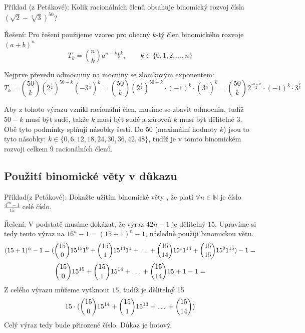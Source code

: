 \documentclass[12pt]{article}
\begin{document}
Příklad (z Petákové): Kolik racionálních členů obsahuje binomický rozvoj čísla $(\sqrt{2} - \sqrt[3]{3})^{50}$?

Řešení: Pro řešení použijeme vzorec pro obecný $k$-tý člen binomického rozvoje $(a + b)^n$
\[T_k = \binom{n}{k}a^{n-k}b^k, \qquad k\in\{0,1,2,\dots,n\}\]

Nejprve převedu odmocniny na mocniny se zlomkovým exponentem:
\[T_k = \binom{50}{k}(2^\frac{1}{2})^{50-k}(-3^\frac{1}{3})^k = 
\binom{50}{k}(2^\frac{1}{2})^{50-k}\cdot(-1)^k\cdot(3^\frac{1}{3})^k = 
\binom{50}{k}2^{\frac{50-k}{2}}\cdot(-1)^k\cdot 3^{\frac{k}{3}}\]

Aby z tohoto výrazu vznikl racionální člen, musíme se zbavit odmocnin, 
tudíž $50-k$ musí být sudé, takže $k$ musí být sudé a zároveň $k$ musí být 
dělitelné $3$. Obě tyto podmínky splňují násobky šesti. Do $50$ (maximální 
hodnoty $k$) jsou to tyto násobky: $k \in \{0,6,12,18,24,30,36,42,48\}$, tudíž 
je v tomto binomickém rozvoji celkem 9 racionálních členů.

\subsection*{Použití binomické věty v důkazu}
Příklad(z Petákové): Dokažte užitím binomické věty , že platí $\forall n \in \mathbb{N}$ je číslo $\frac{4^{2n}-1}{15}$ celé číslo.

Řešení: V podstatě musíme dokázat, že výraz $4{2n} -1$ je dělitelný $15$. Upravíme si tedy tento výraz na $16^n -1 = (15 + 1)^n - 1$, následně použiji binomickou větu.
\[(15 + 1)^n -1 = (\binom{15}{0}15^{15}1^0 + \binom{15}{1}15^{14}1^1 + \text{\dots} + \binom{15}{14}15^1 1^{14} + \binom{15}{15} 15^0 1^{15}) - 1 = \]
\[\binom{15}{0}15^{15} + \binom{15}{1}15^{14} + \text{\dots} + \binom{15}{14}15 + 1 - 1 = \]
Z celého výrazu můžeme vytknout $15$, tudíž je dělitelný 15
\[15\cdot (\binom{15}{0}15^{14} + \binom{15}{1}15^{13} + \text{\dots} + \binom{15}{14})\]
Celý výraz tedy bude přirozené číslo. Důkaz je hotový.
\end{document}
